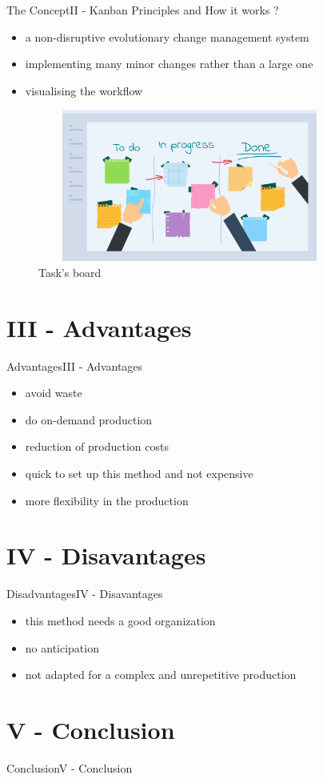 \documentclass[10pt]{beamer}
\newcommand{\PII}{II - Kanban Principles and How it works ?}
\newcommand{\PIII}{III - Advantages}
\newcommand{\PIV}{IV - Disavantages}
\newcommand{\PV}{V - Conclusion}
\begin{document}
\begin{frame}{The Concept}{\PII}
    \begin{itemize}
        \item a non-disruptive evolutionary change management system
        \item implementing many minor changes rather than a large one
        \item visualising the workflow
    \end{itemize}
     \begin{figure}
      \centering
   \includegraphics[width=10cm, height=5cm]{ph.png}
      \caption{Task's board}
     \end{figure}
\end{frame}

\section{\PIII} 
\begin{frame}{Advantages}{\PIII}
    \begin{itemize}
        \item avoid waste
        \item do on-demand production
        \item reduction of production costs
        \item quick to set up this method and not expensive
        \item more flexibility in the production
    \end{itemize}

\end{frame}

\section{\PIV} 
\begin{frame}{Disadvantages}{\PIV}
    \begin{itemize}
        \item this method needs a good organization
        \item no anticipation
        \item not adapted for a complex and unrepetitive production
    \end{itemize}
\end{frame}

\section{\PV} 


\begin{frame}{Conclusion}{\PV}
  

\end{frame}
\end{document}

